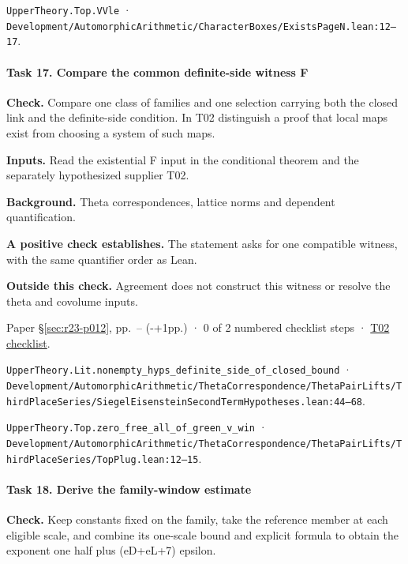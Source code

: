 \nolinkurl{UpperTheory.Top.VVle} · \nolinkurl{Development/AutomorphicArithmetic/CharacterBoxes/ExistsPageN.lean:12–17}.

\paragraph{Task 17. Compare the common definite-side witness F}\label{v7:task-17}

\textbf{Check.} Compare one class of families and one selection carrying both the closed link and the definite-side condition. In T02 distinguish a proof that local maps exist from choosing a system of such maps.

\textbf{Inputs.} Read the existential F input in the conditional theorem and the separately hypothesized supplier T02.

\textbf{Background.} Theta correspondences, lattice norms and dependent quantification.

\textbf{A positive check establishes.} The statement asks for one compatible witness, with the same quantifier order as Lean.

\textbf{Outside this check.} Agreement does not construct this witness or resolve the theta and covolume inputs.

Paper \S\ref{sec:r23-p012}, pp.\ \pageref{sec:r23-p012}--\pageref{r24:synthesis} (\number\numexpr{}-+1\relax pp.) · 0 of 2 numbered checklist steps · \href{https://github.com/GunheeC/rh-lean-verification-atlas/blob/v0.1.0/units/T02.check.md}{T02 checklist}.

\nolinkurl{UpperTheory.Lit.nonempty_hyps_definite_side_of_closed_bound} · \nolinkurl{Development/AutomorphicArithmetic/ThetaCorrespondence/ThetaPairLifts/ThirdPlaceSeries/SiegelEisensteinSecondTermHypotheses.lean:44–68}.

\nolinkurl{UpperTheory.Top.zero_free_all_of_green_v_win} · \nolinkurl{Development/AutomorphicArithmetic/ThetaCorrespondence/ThetaPairLifts/ThirdPlaceSeries/TopPlug.lean:12–15}.

\paragraph{Task 18. Derive the family-window estimate}\label{v7:task-18}

\textbf{Check.} Keep constants fixed on the family, take the reference member at each eligible scale, and combine its one-scale bound and explicit formula to obtain the exponent one half plus (eD+eL+7) epsilon.

